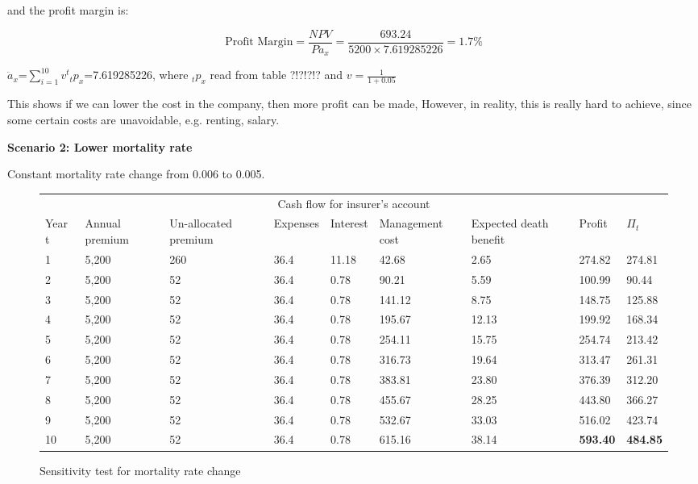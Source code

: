 \documentclass{report}
\begin{document}
and the profit margin is:

\[
\text{Profit Margin} =  \frac{NPV}{P \ddot{a}_x}= \frac{693.24 }{5200 \times 7.619285226} = 1.7\%
\]

$\ddot{a}_x$=$\sum_{i=1}^{10} v^t {_tp_x}$=7.619285226, where $_tp_x$ read from table ?!?!?!? and $v=\frac{1}{1+0.05}$ 

This shows if we can lower the cost in the company, then more profit can be made, However, in reality, this is really hard to achieve, since some certain costs are unavoidable, e.g. renting, salary.




\textbf{Scenario 2: Lower mortality rate} 

Constant mortality rate change from 0.006 to 0.005.



\begin{figure}[H]
\hfill
    \centering
\begin{tabular}{p{0.8cm} p{1.5cm} p{1.5cm} p{1.2cm} p{1cm} p{2cm}p{1.5cm} p{1.5cm} p{1.5cm} }
\toprule
\multicolumn{9}{c}{Cash flow for insurer's account} \\
\cmidrule(r){3-7}

Year t & Annual premium & Un-allocated premium & Expenses & Interest &Management cost& Expected death benefit & Profit& $\Pi_t$  \\
\midrule

1&5,200&260&36.4&11.18&42.68&2.65&274.82&274.81\\
2&5,200&52&36.4&0.78&90.21&5.59&100.99&90.44\\
3&5,200&52&36.4&0.78&141.12&8.75&148.75&125.88\\
4&5,200&52&36.4&0.78&195.67&12.13&199.92&168.34\\
5&5,200&52&36.4&0.78&254.11&15.75&254.74&213.42\\
6&5,200&52&36.4&0.78&316.73&19.64&313.47&261.31\\
7&5,200&52&36.4&0.78&383.81&23.80&376.39&312.20\\
8&5,200&52&36.4&0.78&455.67&28.25&443.80&366.27\\
9&5,200&52&36.4&0.78&532.67&33.03&516.02&423.74\\
10&5,200&52&36.4&0.78&615.16&38.14&\textbf{593.40}&\textbf{484.85}\\

\bottomrule
\end{tabular}
\caption{Sensitivity test for mortality rate change}
\label{determ-sensi-morta}
\end{figure}
\end{document}
